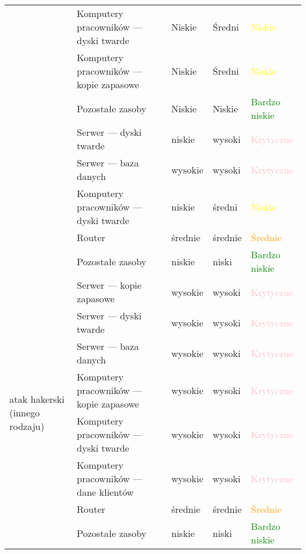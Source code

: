 \begin{landscape}
\begin{longtable}[ht!]{|m{4cm}|m{6cm}|m{4.5cm}|m{3cm}|m{3cm}|}
 		& Komputery pracowników --- dyski twarde & Niskie & Średni & \textcolor{yellow}{Niskie} \\ \cline{2-5}
 		& Komputery pracowników --- kopie zapasowe & Niskie & Średni & \textcolor{yellow}{Niskie} \\ \cline{2-5}
 		& Pozostałe zasoby & Niskie & Niskie & \textcolor{green}{Bardzo niskie} \\
 	\hline
 	\newpage
 	\hline
 	\multirow{4}{4cm}{atak DDoS}
 		& Serwer --- dyski twarde & niskie  & wysoki & \textcolor{pink}{Krytyczne} \\ \cline{2-5} 
 		& Serwer --- baza danych & wysokie & wysoki & \textcolor{pink}{Krytyczne} \\ \cline{2-5} 
 		& Komputery pracowników --- dyski twarde  & niskie  & średni & \textcolor{yellow}{Niskie} \\ \cline{2-5} 
 		& Router & średnie  & średnie & \textcolor{orange}{Średnie} \\ \cline{2-5} 
 		& Pozostałe zasoby & niskie  & niski & \textcolor{green}{Bardzo niskie} \\ 
 		\hline
 	\multirow{8}{4cm}{atak hakerski \linebreak (innego rodzaju)}
 		& Serwer --- kopie zapasowe  & wysokie & wysoki & \textcolor{pink}{Krytyczne} \\ \cline{2-5} 
 		& Serwer --- dyski twarde & wysokie  & wysoki & \textcolor{pink}{Krytyczne} \\ \cline{2-5} 
 		& Serwer --- baza danych & wysokie & wysoki & \textcolor{pink}{Krytyczne} \\ \cline{2-5} 
 		& Komputery pracowników --- kopie zapasowe & wysokie & wysoki & \textcolor{pink}{Krytyczne} \\ \cline{2-5} 
 		& Komputery pracowników --- dyski twarde  & wysokie  & wysoki & \textcolor{pink}{Krytyczne} \\ \cline{2-5} 
 		& Komputery pracowników --- dane klientów & wysokie & wysoki & \textcolor{pink}{Krytyczne} \\ \cline{2-5} 
 		& Router & średnie  & średnie & \textcolor{orange}{Średnie} \\ \cline{2-5} 
 		& Pozostałe zasoby & niskie  & niski & \textcolor{green}{Bardzo niskie} \\ 
 	\hline
\end{longtable}
\end{landscape}

